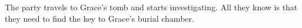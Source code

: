 The party travels to Grace's tomb and starts investigating.
All they know is that they need to find the key to Grace's burial chamber.
